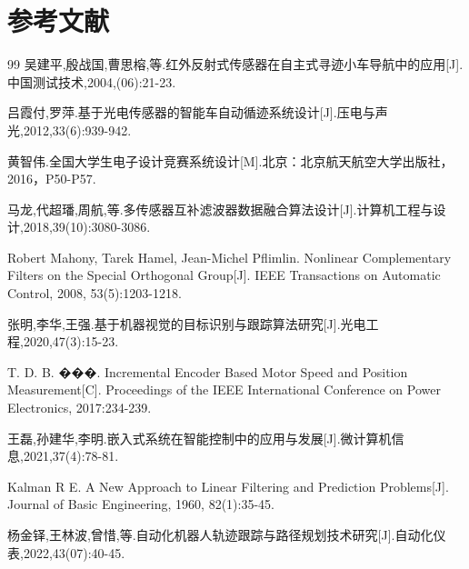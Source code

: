 \documentclass[12pt,a4paper]{ctexart}
\begin{document}
\section{\textbf{参考文献}}
\renewcommand{\refname}{}
\vspace{-25pt}
{
\begin{thebibliography}{99}
     吴建平,殷战国,曹思榕,等.红外反射式传感器在自主式寻迹小车导航中的应用[J].中国测试技术,2004,(06):21-23.

     吕霞付,罗萍.基于光电传感器的智能车自动循迹系统设计[J].压电与声光,2012,33(6):939-942.

     黄智伟.全国大学生电子设计竞赛系统设计[M].北京：北京航天航空大学出版社，2016，P50-P57.

     马龙,代超璠,周航,等.多传感器互补滤波器数据融合算法设计[J].计算机工程与设计,2018,39(10):3080-3086.

     Robert Mahony, Tarek Hamel, Jean-Michel Pflimlin. Nonlinear Complementary Filters on the Special Orthogonal Group[J]. IEEE Transactions on Automatic Control, 2008, 53(5):1203-1218.

     张明,李华,王强.基于机器视觉的目标识别与跟踪算法研究[J].光电工程,2020,47(3):15-23.

     T. D. B. ���. Incremental Encoder Based Motor Speed and Position Measurement[C]. Proceedings of the IEEE International Conference on Power Electronics, 2017:234-239.

     王磊,孙建华,李明.嵌入式系统在智能控制中的应用与发展[J].微计算机信息,2021,37(4):78-81.

     Kalman R E. A New Approach to Linear Filtering and Prediction Problems[J]. Journal of Basic Engineering, 1960, 82(1):35-45.

     杨金铎,王林波,曾惜,等.自动化机器人轨迹跟踪与路径规划技术研究[J].自动化仪表,2022,43(07):40-45.
\end{thebibliography}
}
\end{document}

